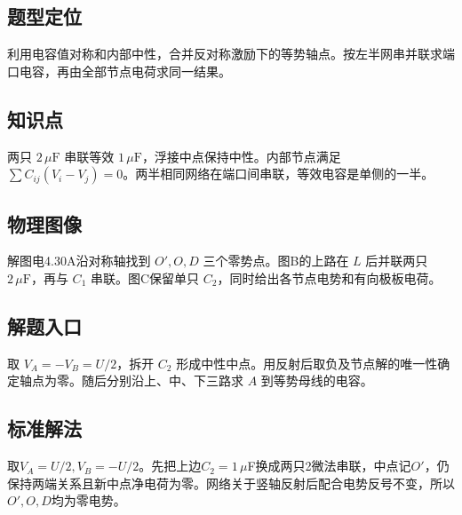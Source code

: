 \documentclass[UTF8,fontset=fandol,a4paper,11pt]{ctexart}
\begin{document}


\subsection*{题型定位}

利用电容值对称和内部中性，合并反对称激励下的等势轴点。按左半网串并联求端口电容，再由全部节点电荷求同一结果。



\subsection*{知识点}

两只 $2\,\mu\mathrm F$ 串联等效 $1\,\mu\mathrm F$，浮接中点保持中性。内部节点满足 $\sum C_{ij}(V_i-V_j)=0$。两半相同网络在端口间串联，等效电容是单侧的一半。



\subsection*{物理图像}

解图电4.30A沿对称轴找到 $O',O,D$ 三个零势点。图B的上路在 $L$ 后并联两只 $2\,\mu\mathrm F$，再与 $C_1$ 串联。图C保留单只 $C_2$，同时给出各节点电势和有向极板电荷。



\subsection*{解题入口}

取 $V_A=-V_B=U/2$，拆开 $C_2$ 形成中性中点。用反射后取负及节点解的唯一性确定轴点为零。随后分别沿上、中、下三路求 $A$ 到等势母线的电容。


\subsection*{标准解法}

取$V_A=U/2,V_B=-U/2$。先把上边$C_2=1\,\mu$F换成两只2微法串联，中点记$O'$，仍保持两端关系且新中点净电荷为零。网络关于竖轴反射后配合电势反号不变，所以$O',O,D$均为零电势。
\end{document}
